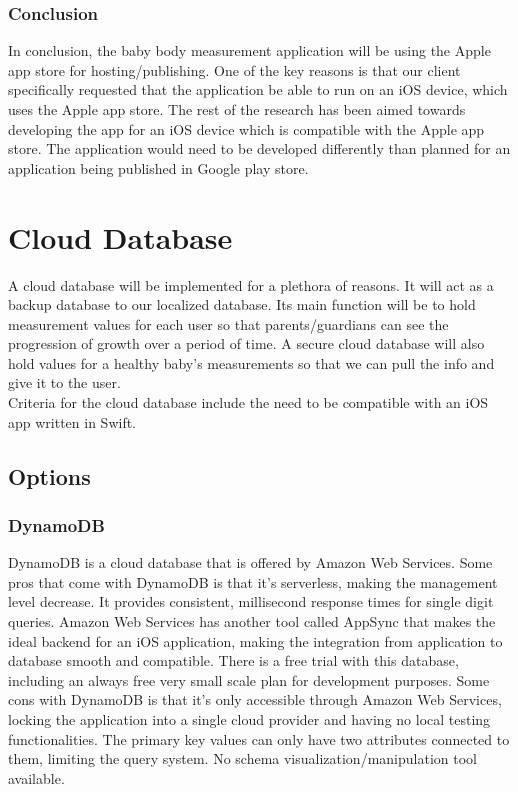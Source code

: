 \documentclass[letterpaper,10pt,draftclsnofoot,onecolumn,compsoc]{IEEEtran}
\begin{document}
\subsubsection{Conclusion}
\begin{singlespace}
\noindent
In conclusion, the baby body measurement application will be using the Apple app store for hosting/publishing. One of the key reasons is that our client specifically requested that the application be able to run on an iOS device, which uses the Apple app store. The rest of the research has been aimed towards developing the app for an iOS device which is compatible with the Apple app store. The application would need to be developed differently than planned for an application being published in Google play store.
\end{singlespace}



\section{Cloud Database}
\begin{singlespace}
\noindent
A cloud database will be implemented for a plethora of reasons. It will act as a backup database to our localized database. Its main function will be to hold measurement values for each user so that parents/guardians can see the progression of growth over a period of time. A secure cloud database will also hold values for a healthy baby's measurements so that we can pull the info and give it to the user. \\ 

Criteria for the cloud database include the need to be compatible with an iOS app written in Swift. 
\end{singlespace}
\subsection{Options}


\subsubsection{DynamoDB}
\begin{singlespace}
\noindent
DynamoDB is a cloud database that is offered by Amazon Web Services. Some pros that come with DynamoDB is that it's serverless, making the management level decrease. It provides consistent, millisecond response times for single digit queries. Amazon Web Services has another tool called AppSync that makes the ideal backend for an iOS application, making the integration from application to database smooth and compatible. There is a free trial with this database, including an always free very small scale plan for development purposes. Some cons with DynamoDB is that it's only accessible through Amazon Web Services, locking the application into a single cloud provider and having no local testing functionalities. The primary key values can only have two attributes connected to them, limiting the query system. No schema visualization/manipulation tool available.
\end{singlespace}
\end{document}
